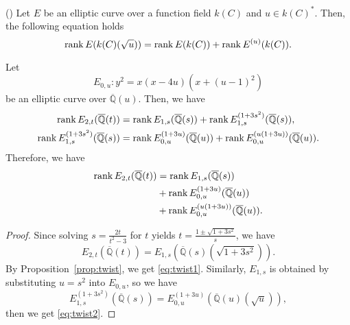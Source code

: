 \documentclass[main]{subfiles}
\begin{document}
\begin{prop}{(\cite[Exercise 10.16]{ref:aec})}
    \label{prop:twist}
    Let $E$ be an elliptic curve over a function field $k(C)$ and $u \in k(C)^*$.
    Then, the following equation holds
    \begin{equation*}
        \operatorname{rank} E(k(C)(\sqrt{u})) = \operatorname{rank} E(k(C)) + \operatorname{rank} E^{(u)}(k(C)).
    \end{equation*}
\end{prop}

\begin{thm}
    Let
    \begin{equation*}
        E_{0,u}: y^{2} = x(x - 4u)(x + (u - 1)^{2})
    \end{equation*}
    be an elliptic curve over $\overline{\mathbb{Q}}(u)$.
    Then, we have
    \begin{align}
        \operatorname{rank} E_{2,t}(\overline{\mathbb{Q}}(t))                & = \operatorname{rank} E_{1,s}(\overline{\mathbb{Q}}(s)) + \operatorname{rank} E_{1,s}^{(1 + 3s^{2})}(\overline{\mathbb{Q}}(s)), \label{eq:twist1}           \\
        \operatorname{rank} E_{1,s}^{(1 + 3s^{2})}(\overline{\mathbb{Q}}(s)) & = \operatorname{rank} E_{0,u}^{(1 + 3u)}(\overline{\mathbb{Q}}(u)) + \operatorname{rank} E_{0,u}^{(u(1 + 3u))}(\overline{\mathbb{Q}}(u)). \label{eq:twist2}
    \end{align}
    Therefore, we have
    \begin{equation}
        \label{eq:rankdecomposition}
        \begin{split}
            \operatorname{rank} E_{2,t}(\overline{\mathbb{Q}}(t)) & = \operatorname{rank} E_{1,s}(\overline{\mathbb{Q}}(s))                \\
                                                    & + \operatorname{rank} E_{0,u}^{(1 + 3u)}(\overline{\mathbb{Q}}(u))     \\
                                                    & + \operatorname{rank} E_{0,u}^{(u(1 + 3u))}(\overline{\mathbb{Q}}(u)).
        \end{split}
    \end{equation}
\end{thm}
\begin{proof}
    Since solving $s = \frac{2t}{t^{2} - 3}$ for $t$ yields $t = \frac{1 \pm \sqrt{1 + 3s^{2}}}{s}$, we have
    \begin{equation*}
        E_{2,t}(\overline{\mathbb{Q}}(t)) = E_{1,s}(\overline{\mathbb{Q}}(s)(\sqrt{1 + 3s^{2}})).
    \end{equation*}
    By Proposition~\ref{prop:twist}, we get \eqref{eq:twist1}.
    Similarly, $E_{1,s}$ is obtained by substituting $u = s^{2}$ into $E_{0,u}$, so we have
    \begin{equation*}
        E_{1,s}^{(1 + 3s^{2})}(\overline{\mathbb{Q}}(s)) = E_{0,u}^{(1 + 3u)}(\overline{\mathbb{Q}}(u)(\sqrt{u})),
    \end{equation*}
    then we get \eqref{eq:twist2}.
\end{proof}
\end{document}

